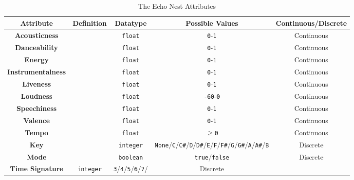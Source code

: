 \begin{longtable}[c]{|c|c|c|c|c|}
    \caption{The Echo Nest Attributes}\\%
    \toprule
    \textbf{Attribute} & \textbf{Definition} & \textbf{Datatype} & \textbf{Possible Values} & \textbf{Continuous/Discrete} \\
    \midrule
    \endfirsthead

    \textbf{Acousticness} & & \lstinline|float| & \lstinline|0|-\lstinline|1| & Continuous\\
    \midrule
    \textbf{Danceability} & & \lstinline|float| & \lstinline|0|-\lstinline|1| & Continuous\\
    \midrule
    \textbf{Energy} & & \lstinline|float| & \lstinline|0|-\lstinline|1| & Continuous\\
    \midrule
    \textbf{Instrumentalness} & & \lstinline|float| & \lstinline|0|-\lstinline|1| & Continuous\\
    \midrule
    \textbf{Liveness} & & \lstinline|float| & \lstinline|0|-\lstinline|1| & Continuous\\
    \midrule
    \textbf{Loudness} & & \lstinline|float| & \lstinline|-60|-\lstinline|0| & Continuous\\
    \midrule
    \textbf{Speechiness} & & \lstinline|float| & \lstinline|0|-\lstinline|1| & 
    Continuous\\
    \midrule
    \textbf{Valence} & & \lstinline|float| & \lstinline|0|-\lstinline|1| & Continuous\\
    \midrule
    \textbf{Tempo} & & \lstinline|float| & \(\ge\)\lstinline|0| & Continuous\\
    \midrule
    \textbf{Key} & & \lstinline|integer| & \lstinline|None|/\lstinline|C|/\lstinline|C#|/\lstinline|D|/\lstinline|D#|/\lstinline|E|/\lstinline|F|/\lstinline|F#|/\lstinline|G|/\lstinline|G#|/\lstinline|A|/\lstinline|A#|/\lstinline|B| & Discrete\\
    \midrule
    \textbf{Mode} & & \lstinline|boolean| & \lstinline|true|/\lstinline|false| & Discrete\\
    \midrule
    \textbf{Time Signature} & \lstinline|integer| & \lstinline|3|/\lstinline|4|/\lstinline|5|/\lstinline|6|/\lstinline|7|/ & Discrete\\
    \midrule
    
\end{longtable}

